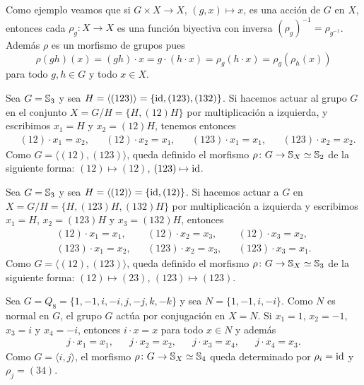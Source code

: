 Como ejemplo veamos que si $G\times X\to X$, $(g,x)\mapsto x$, es una acción de $G$ en $X$, entonces
cada $\rho_g\colon X\to X$ es una función biyectiva con inversa $(\rho_g)^{-1}=\rho_{g^{-1}}$. Además $\rho$ es un morfismo de grupos pues
\[
\rho(gh)(x)=(gh)\cdot x=g\cdot (h\cdot x)=\rho_g(h\cdot x)=\rho_g(\rho_h(x))
\]
para todo $g,h\in G$ y todo $x\in X$. 

\begin{example}
Sea $G=\mathbb{S}_3$ y sea $H=\langle (123)\rangle=\{\operatorname{id},(123),(132)\}$. Si hacemos actuar al grupo $G$ en el conjunto $X=G/H=\{H,(12)H\}$ 
por multiplicación a izquierda, y escribimos  
$x_1=H$ y $x_2=(12)H$, tenemos entonces
\begin{align*}
&(12)\cdot x_1=x_2,
&&(12)\cdot x_2=x_1,
&&(123)\cdot x_1=x_1,
&&(123)\cdot x_2=x_2.
\end{align*}
Como $G=\langle (12),(123)\rangle$, queda definido el morfismo 
$\rho\colon G\to\mathbb{S}_{X}\simeq\mathbb{S}_2$ de la siguiente forma: $(12)\mapsto (12)$, $(123)\mapsto\operatorname{id}$. 
\end{example}

\begin{example}
Sea $G=\mathbb{S}_3$ y sea $H=\langle (12)\rangle=\{\operatorname{id},(12)\}$. Si hacemos actuar a $G$ en $X=G/H=\{H,(123)H,(132)H\}$ por multiplicación a izquierda y 
escribimos $x_1=H$, $x_2=(123)H$ y $x_3=(132)H$, entonces
\begin{align*}
(12)\cdot x_1=x_1,&& (12)\cdot x_2=x_3, && (12)\cdot x_3=x_2,\\
(123)\cdot x_1=x_2, && (123)\cdot x_2=x_3, &&(123)\cdot x_3=x_1.
\end{align*}
Como $G=\langle (12),(123)\rangle$, queda definido el morfismo 
$\rho\colon G\to\mathbb{S}_{X}\simeq\mathbb{S}_3$ de la siguiente forma: $(12)\mapsto (23)$, $(123)\mapsto (123)$. 
\end{example}

\begin{example}
Sea $G=Q_8=\{1,-1,i,-i,j,-j,k,-k\}$ y sea $N=\{1,-1,i,-i\}$. Como $N$ es normal en $G$, el grupo $G$ actúa por conjugación en $X=N$. 
Si $x_1=1$, $x_2=-1$, $x_3=i$ y $x_4=-i$, entonces $i\cdot x=x$ para todo $x\in N$ y además 
\begin{align*}
j\cdot x_1=x_1, && j\cdot x_2=x_2, && j\cdot x_3=x_4, && j\cdot x_4=x_3. 
\end{align*}
Como $G=\langle i,j\rangle$, el morfismo $\rho\colon G\to\mathbb{S}_X\simeq\mathbb{S}_4$ queda determinado por
$\rho_i=\operatorname{id}$ y $\rho_j=(34)$. 
\end{example}

